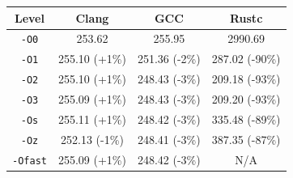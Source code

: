 \begin{tabular*}{\columnwidth}{@{\extracolsep\fill}cccc@{\extracolsep\fill}}
\toprule
\textbf{Level} & \textbf{Clang} & \textbf{GCC} & \textbf{Rustc} \\
\midrule
\texttt{-O0} & 253.62 & 255.95 & 2990.69 \\
\texttt{-O1} & 255.10 (+1\%) & 251.36 (-2\%) & 287.02 (-90\%) \\
\texttt{-O2} & 255.10 (+1\%) & 248.43 (-3\%) & 209.18 (-93\%) \\
\texttt{-O3} & 255.09 (+1\%) & 248.43 (-3\%) & 209.20 (-93\%) \\
\texttt{-Os} & 255.11 (+1\%) & 248.42 (-3\%) & 335.48 (-89\%) \\
\texttt{-Oz} & 252.13 (-1\%) & 248.41 (-3\%) & 387.35 (-87\%) \\
\texttt{-Ofast} & 255.09 (+1\%) & 248.42 (-3\%) & N/A \\
\bottomrule
\end{tabular*}
